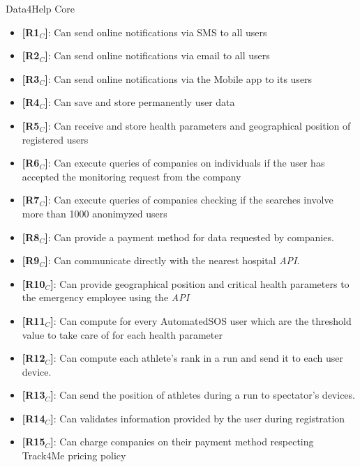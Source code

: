 \noindent Data4Help Core
\begin{itemize}
    \item \textbf{[R1$_C$]}: Can send online notifications via SMS to all users 
    \item \textbf{[R2$_C$]}: Can send online notifications via email to all users
    \item \textbf{[R3$_C$]}: Can send online notifications via the Mobile app to its users
    \item \textbf{[R4$_C$]}: Can save and store permanently user data
    \item \textbf{[R5$_C$]}: Can receive and store health parameters and geographical position of registered users
    \item \textbf{[R6$_C$]}: Can execute queries of companies on individuals if the user has accepted the monitoring request from the company
    \item \textbf{[R7$_C$]}: Can execute queries of companies checking if the searches involve more than 1000 anonimyzed users 
    \item \textbf{[R8$_C$]}: Can provide a payment method for data requested by companies.
    \item \textbf{[R9$_C$]}: Can communicate directly with the nearest hospital \textit{API}.
    \item \textbf{[R10$_C$]}: Can provide geographical position and critical health parameters to the emergency employee using the \textit{API}
    \item \textbf{[R11$_C$]}: Can compute for every AutomatedSOS user which are the threshold value to take care of for each health parameter
    
    
    \item \textbf{[R12$_C$]}: Can compute each athlete's rank in a run and send it to each user device.
    \item \textbf{[R13$_C$]}: Can send the position of athletes during a run to spectator's devices.
    \item \textbf{[R14$_C$]}: Can validates information provided by the user during registration
    \item \textbf{[R15$_C$]}: Can charge companies on their payment method respecting Track4Me pricing policy



\end{itemize}
